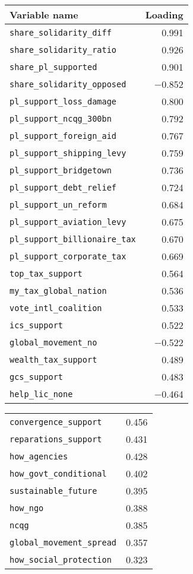 
\begin{tabular}{lr}
\toprule
Variable name & Loading\\
\midrule
\verb|share_solidarity_diff| & 0.991\\
\verb|share_solidarity_ratio| & 0.926\\
\verb|share_pl_supported| & 0.901\\
\verb|share_solidarity_opposed| & $-$0.852\\
\verb|pl_support_loss_damage| & 0.800\\
\verb|pl_support_ncqg_300bn| & 0.792\\
\verb|pl_support_foreign_aid| & 0.767\\
\verb|pl_support_shipping_levy| & 0.759\\
\verb|pl_support_bridgetown| & 0.736\\
\verb|pl_support_debt_relief| & 0.724\\
\verb|pl_support_un_reform| & 0.684\\
\verb|pl_support_aviation_levy| & 0.675\\
\verb|pl_support_billionaire_tax| & 0.670\\
\verb|pl_support_corporate_tax| & 0.669\\
\verb|top_tax_support| & 0.564\\
\verb|my_tax_global_nation| & 0.536\\
\verb|vote_intl_coalition| & 0.533\\
\verb|ics_support| & 0.522\\
\verb|global_movement_no| & $-$0.522\\
\verb|wealth_tax_support| & 0.489\\
\verb|gcs_support| & 0.483\\
\verb|help_lic_none| & $-$0.464\\
\bottomrule \end{tabular} \switchcolumn \begin{tabular}[h]{lr} \verb|convergence_support| & 0.456\\
\verb|reparations_support| & 0.431\\
\verb|how_agencies| & 0.428\\
\verb|how_govt_conditional| & 0.402\\
\verb|sustainable_future| & 0.395\\
\verb|how_ngo| & 0.388\\
\verb|ncqg| & 0.385\\
\verb|global_movement_spread| & 0.357\\
\verb|how_social_protection| & 0.323\\

\end{tabular}
